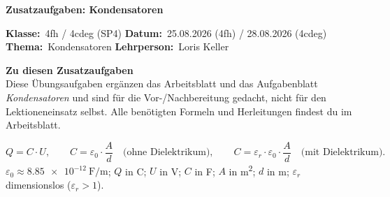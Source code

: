 \documentclass[addpoints,11pt,a4paper]{exam}
\newenvironment{infobox}{%
  \par\addvspace{10pt}\noindent
}{%
  \par\addvspace{10pt}
}
\newcommand{\Kopfzeile}[4]{%
  \begin{titlebox}
    {\color{white}\sffamily\bfseries\Large #4}
  \end{titlebox}
  \vspace{0.5em}
  \noindent\textbf{Klasse:}~#1 \hfill \textbf{Datum:}~#2 \hfill \textbf{Thema:}~#3
    \hfill \textbf{Lehrperson:}~Loris Keller
  \vspace{0.8em}
  \lhead{\textcolor{darkgray}{#3}}
  \rhead{\textcolor{darkgray}{#4}}
}
\newcommand{\Klasse}{4fh / 4cdeg (SP4)}
\newcommand{\Datum}{25.08.2026 (4fh) / 28.08.2026 (4cdeg)}
\newcommand{\Thema}{Kondensatoren}
\newcommand{\ZusatzaufgabenTitel}{Zusatzaufgaben: Kondensatoren}
\begin{document}
\Kopfzeile{\Klasse}{\Datum}{\Thema}{\ZusatzaufgabenTitel}

\begin{infobox}
\textbf{Zu diesen Zusatzaufgaben}\\
Diese Übungsaufgaben ergänzen das Arbeitsblatt und das Aufgabenblatt
\emph{Kondensatoren} und sind für die Vor-/Nachbereitung gedacht, nicht für
den Lektioneneinsatz selbst. Alle benötigten Formeln und Herleitungen
findest du im Arbeitsblatt.
\end{infobox}

\begin{formelbox}[Formelsammlung]
\[
  Q = C\cdot U, \qquad C = \varepsilon_0\cdot\frac{A}{d} \quad\text{(ohne Dielektrikum)}, \qquad C = \varepsilon_r\cdot\varepsilon_0\cdot\frac{A}{d} \quad\text{(mit Dielektrikum)}.
\]
$\varepsilon_0\approx\SI{8.85e-12}{\farad\per\meter}$; $Q$ in \si{\coulomb};
$U$ in \si{\volt}; $C$ in \si{\farad}; $A$ in \si{\meter\squared}; $d$ in
\si{\meter}; $\varepsilon_r$ dimensionslos ($\varepsilon_r>1$).
\end{formelbox}
\end{document}
